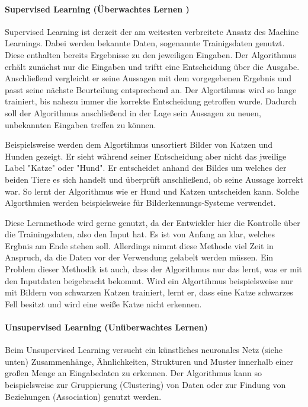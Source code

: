 \documentclass[a4paper,12pt, german]{report}
\begin{document}
\paragraph{Supervised Learning (Überwachtes Lernen )} $ $ \\ Supervised Learning ist derzeit der am weitesten verbreitete Ansatz des Machine Learnings. Dabei werden bekannte Daten, sogenannte Trainigsdaten genutzt. Diese enthalten bereits Ergebnisse zu den jeweiligen Eingaben. Der Algorithmus erhält zunächst nur die Eingaben und triftt eine Entscheidung über die Ausgabe. Anschließend vergleicht er seine Aussagen mit dem vorgegebenen Ergebnis und passt seine nächste Beurteilung entsprechend an. Der Algortihmus wird so lange trainiert, bis nahezu immer die korrekte Entscheidung getroffen wurde. Dadurch soll der Algorithmus anschließend in der Lage sein Aussagen zu neuen, unbekannten Eingaben treffen zu können.

Beispielsweise werden dem Algortihmus unsortiert Bilder von Katzen und Hunden gezeigt. Er sieht während seiner Entscheidung aber nicht das jweilige Label "Katze" oder "Hund". Er entscheidet anhand des Bildes um welches der beiden Tiere es sich handelt und überprüft anschließend, ob seine Aussage korrekt war. So lernt der Algorithmus wie er Hund und Katzen untscheiden kann. Solche Algorthmien werden beispielsweise für Bilderkennungs-Systeme verwendet. 

Diese Lernmethode wird gerne genutzt, da der Entwickler hier die Kontrolle über die Trainingsdaten, also den Input hat. Es ist von Anfang an klar, welches Ergbnis am Ende stehen soll. Allerdings nimmt diese Methode viel Zeit in Anspruch, da die Daten vor der Verwendung gelabelt werden müssen. Ein Problem dieser Methodik ist auch, dass der Algorithmus nur das lernt, was er mit den Inputdaten beigebracht bekommt. Wird ein Algortihmus beispielsweise nur mit Bildern von schwarzen Katzen trainiert, lernt er, dass eine Katze schwarzes Fell besitzt und wird eine weiße Katze nicht erkennen.

\paragraph{Unsupervised Learning (Unüberwachtes Lernen)} $  $ \\ Beim Unsupervised Learning versucht ein künstliches neuronales Netz (siehe unten) Zusammenhänge, Ähnlichkeiten, Strukturen und Muster innerhalb einer großen Menge an Eingabedaten zu erkennen. Der Algorithmus kann so beispielsweise zur Gruppierung (Clustering) von Daten oder zur Findung von Beziehungen (Association) genutzt werden.
\end{document}

